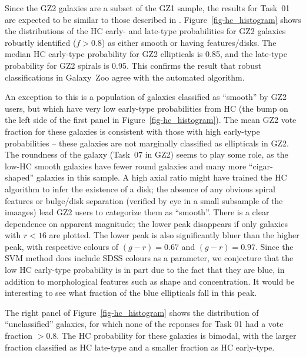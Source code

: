 \documentclass[useAMS,usenatbib]{mn2e}
\begin{document}
Since the GZ2 galaxies are a subset of the GZ1 sample, the results for Task~01 are expected to be similar to those described in \citet{hue11}. Figure~\ref{fig-hc_histogram} shows the distributions of the HC early- and late-type probabilities for GZ2 galaxies robustly identified ($f>0.8$) as either smooth or having features/disks. The median HC early-type probability for GZ2 ellipticals is 0.85, and the late-type probability for GZ2 spirals is 0.95. This confirms the result that robust classifications in Galaxy~Zoo agree with the automated algorithm. 

An exception to this is a population of galaxies classified as ``smooth'' by GZ2 users, but which have very low early-type probabilities from HC (the bump on the left side of the first panel in Figure~\ref{fig-hc_histogram}). The mean GZ2 vote fraction for these galaxies is consistent with those with high early-type probabilities -- these galaxies are not marginally classified as ellipticals in GZ2. The roundness of the galaxy (Task~07 in GZ2) seems to play some role, as the low-HC smooth galaxies have fewer round galaxies and many more ``cigar-shaped'' galaxies in this sample. A high axial ratio might have trained the HC algorithm to infer the existence of a disk; the absence of any obvious spiral features or bulge/disk separation (verified by eye in a small subsample of the imaages) lead GZ2 users to categorize them as ``smooth''. There is a clear dependence on apparent magnitude; the lower peak disappears if only galaxies with $r<16$ are plotted. The lower peak is also significantly bluer than the higher peak, with respective colours of $(g-r)=0.67$ and $(g-r)=0.97$. Since the SVM method does include SDSS colours as a parameter, we conjecture that the low HC early-type probability is in part due to the fact that they are blue, in addition to morphological features such as shape and concentration. It would be interesting to see what fraction of the blue ellipticals \citep{sch09} fall in this peak. 

The right panel of Figure~\ref{fig-hc_histogram} shows the distribution of ``unclassified'' galaxies, for which none of the reponses for Task 01 had a vote fraction $>0.8$. The HC probability for these galaxies is bimodal, with the larger fraction classified as HC late-type and a smaller fraction as HC early-type. 
\end{document}
